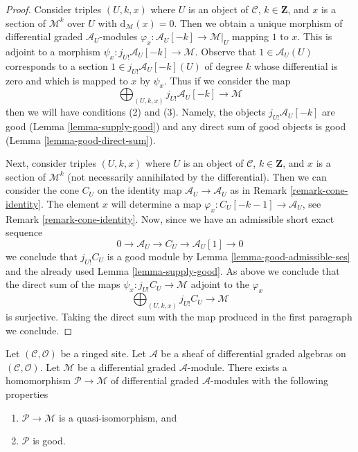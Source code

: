 \begin{proof}
Consider triples $(U, k, x)$ where $U$ is an object of $\mathcal{C}$,
$k \in \mathbf{Z}$, and $x$ is a section of $\mathcal{M}^k$ over $U$
with $\text{d}_\mathcal{M}(x) = 0$. Then we obtain a unique morphism
of differential graded $\mathcal{A}_U$-modules
$\varphi_x : \mathcal{A}_U[-k] \to \mathcal{M}|_U$
mapping $1$ to $x$. This is adjoint to a morphism
$\psi_x : j_{U!}\mathcal{A}_U[-k] \to \mathcal{M}$.
Observe that $1 \in \mathcal{A}_U(U)$ corresponds to
a section $1 \in j_{U!}\mathcal{A}_U[-k](U)$ of degree $k$
whose differential is zero and which is mapped to $x$ by $\psi_x$.
Thus if we consider the map
$$
\bigoplus\nolimits_{(U, k, x)} j_{U!}\mathcal{A}_U[-k]
\longrightarrow
\mathcal{M}
$$
then we will have conditions (2) and (3). Namely, the objects
$j_{U!}\mathcal{A}_U[-k]$ are good (Lemma \ref{lemma-supply-good})
and any direct sum of good objects is good (Lemma \ref{lemma-good-direct-sum}).

\medskip\noindent
Next, consider triples $(U, k, x)$ where $U$ is an object of $\mathcal{C}$,
$k \in \mathbf{Z}$, and $x$ is a section of $\mathcal{M}^k$ (not necessarily
annihilated by the differential). Then we can consider
the cone $C_U$ on the identity map $\mathcal{A}_U \to \mathcal{A}_U$
as in Remark \ref{remark-cone-identity}. The element $x$ will determine a map
$\varphi_x : C_U[-k - 1] \to \mathcal{A}_U$, see
Remark \ref{remark-cone-identity}. Now, since we have
an admissible short exact sequence
$$
0 \to \mathcal{A}_U \to C_U \to \mathcal{A}_U[1] \to 0
$$
we conclude that $j_{U!}C_U$ is a good module by
Lemma \ref{lemma-good-admissible-ses} and
the already used Lemma \ref{lemma-supply-good}.
As above we conclude that the direct sum of the maps
$\psi_x : j_{U!}C_U \to \mathcal{M}$ adjoint to the $\varphi_x$
$$
\bigoplus\nolimits_{(U, k, x)} j_{U!}C_U \longrightarrow \mathcal{M}
$$
is surjective. Taking the direct sum with the map produced
in the first paragraph we conclude.
\end{proof}

\begin{lemma}
\label{lemma-resolve}
Let $(\mathcal{C}, \mathcal{O})$ be a ringed site.
Let $\mathcal{A}$ be a sheaf of differential graded algebras
on $(\mathcal{C}, \mathcal{O})$. Let $\mathcal{M}$
be a differential graded $\mathcal{A}$-module. There exists a homomorphism
$\mathcal{P} \to \mathcal{M}$ of differential graded $\mathcal{A}$-modules
with the following properties
\begin{enumerate}
\item $\mathcal{P} \to \mathcal{M}$ is a quasi-isomorphism, and
\item $\mathcal{P}$ is good.
\end{enumerate}
\end{lemma}

